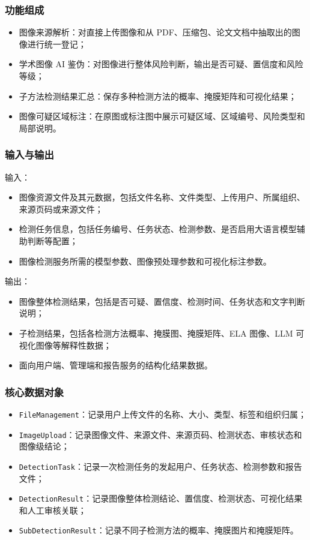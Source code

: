 \subsubsection{功能组成}
\begin{itemize}[leftmargin=2em]
    \item 图像来源解析：对直接上传图像和从 PDF、压缩包、论文文档中抽取出的图像进行统一登记；
    \item 学术图像 AI 鉴伪：对图像进行整体风险判断，输出是否可疑、置信度和风险等级；
    \item 子方法检测结果汇总：保存多种检测方法的概率、掩膜矩阵和可视化结果；
    \item 图像可疑区域标注：在原图或标注图中展示可疑区域、区域编号、风险类型和局部说明。
\end{itemize}

\subsubsection{输入与输出}
输入：
\begin{itemize}[leftmargin=2em]
    \item 图像资源文件及其元数据，包括文件名称、文件类型、上传用户、所属组织、来源页码或来源文件；
    \item 检测任务信息，包括任务编号、任务状态、检测参数、是否启用大语言模型辅助判断等配置；
    \item 图像检测服务所需的模型参数、图像预处理参数和可视化标注参数。
\end{itemize}

输出：
\begin{itemize}[leftmargin=2em]
    \item 图像整体检测结果，包括是否可疑、置信度、检测时间、任务状态和文字判断说明；
    \item 子检测结果，包括各检测方法概率、掩膜图、掩膜矩阵、ELA 图像、LLM 可视化图像等解释性数据；
    \item 面向用户端、管理端和报告服务的结构化结果数据。
\end{itemize}

\subsubsection{核心数据对象}
\begin{itemize}[leftmargin=2em]
    \item \texttt{FileManagement}：记录用户上传文件的名称、大小、类型、标签和组织归属；
    \item \texttt{ImageUpload}：记录图像文件、来源文件、来源页码、检测状态、审核状态和图像级结论；
    \item \texttt{DetectionTask}：记录一次检测任务的发起用户、任务状态、检测参数和报告文件；
    \item \texttt{DetectionResult}：记录图像整体检测结论、置信度、检测状态、可视化结果和人工审核关联；
    \item \texttt{SubDetectionResult}：记录不同子检测方法的概率、掩膜图片和掩膜矩阵。
\end{itemize}

